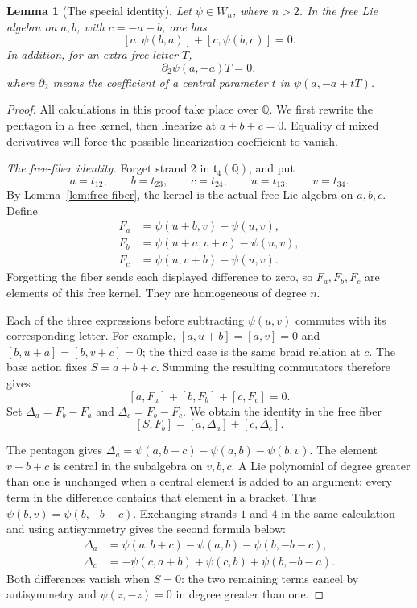 \documentclass[11pt]{article}
\newtheorem{lemma}[theorem]{Lemma}
\theoremstyle{definition}
\theoremstyle{remark}
\numberwithin{equation}{section}
\begin{document}
\begin{lemma}[The special identity]\label{lem:special}
Let \(\psi\in W_n\), where \(n>2\).  In the free Lie algebra on
\(a,b\), with \(c=-a-b\), one has
\begin{equation}\label{eq:special}
 [a,\psi(b,a)]+[c,\psi(b,c)]=0.
\end{equation}
In addition, for an extra free letter \(T\),
\begin{equation}\label{eq:special-linearization}
 \partial_2\psi(a,-a)T=0,
\end{equation}
where \(\partial_2\) means the coefficient of a central parameter
\(t\) in \(\psi(a,-a+tT)\).
\end{lemma}
\begin{proof}
All calculations in this proof take place over \(\mathbb Q\).  We first
rewrite the pentagon in a free kernel, then linearize at \(a+b+c=0\).
Equality of mixed derivatives will force the possible linearization
coefficient to vanish.

\emph{The free-fiber identity.}
Forget strand \(2\) in \(\mathfrak t_4(\mathbb Q)\), and put
\[
 a=t_{12},\qquad b=t_{23},\qquad c=t_{24},\qquad
 u=t_{13},\qquad v=t_{34}.
\]
By Lemma~\ref{lem:free-fiber}, the kernel is the actual free Lie
algebra on \(a,b,c\).  Define
\begin{align*}
 F_a&=\psi(u+b,v)-\psi(u,v),\\
 F_b&=\psi(u+a,v+c)-\psi(u,v),\\
 F_c&=\psi(u,v+b)-\psi(u,v).
\end{align*}
Forgetting the fiber sends each displayed difference to zero, so
\(F_a,F_b,F_c\) are elements of this free kernel.  They are
homogeneous of degree \(n\).

Each of the three expressions before subtracting \(\psi(u,v)\)
commutes with its corresponding letter.  For example,
\([a,u+b]=[a,v]=0\) and
\([b,u+a]=[b,v+c]=0\); the third case is the same braid relation at
\(c\).  The base action fixes \(S=a+b+c\).  Summing the resulting
commutators therefore gives
\[
 [a,F_a]+[b,F_b]+[c,F_c]=0.
\]
Set \(\Delta_a=F_b-F_a\) and \(\Delta_c=F_b-F_c\).  We obtain the
identity in the free fiber
\begin{equation}\label{eq:special-fiber}
 [S,F_b]=[a,\Delta_a]+[c,\Delta_c].
\end{equation}

The pentagon gives
\(\Delta_a=\psi(a,b+c)-\psi(a,b)-\psi(b,v)\).
The element \(v+b+c\) is central in the subalgebra on \(v,b,c\).
A Lie polynomial of degree greater than one is unchanged when a
central element is added to an argument: every term in the difference
contains that element in a bracket.  Thus \(\psi(b,v)=\psi(b,-b-c)\).
Exchanging strands \(1\) and \(4\) in the same calculation and using
antisymmetry gives the second formula below:
\begin{align}
 \Delta_a&=\psi(a,b+c)-\psi(a,b)-\psi(b,-b-c),
       \label{eq:special-delta-a}\\
 \Delta_c&=-\psi(c,a+b)+\psi(c,b)+\psi(b,-b-a).
       \label{eq:special-delta-c}
\end{align}
Both differences vanish when \(S=0\): the two remaining terms cancel
by antisymmetry and \(\psi(z,-z)=0\) in degree greater than one.


\end{proof}
\end{document}
